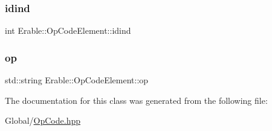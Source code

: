 \mbox{\label{class_erable_1_1_op_code_element_a7a7b309abb91e24736ecbf60f0cca4f0}} 
\subsubsection{\texorpdfstring{idind}{idind}}
{\footnotesize\ttfamily int Erable\+::\+Op\+Code\+Element\+::idind}

\mbox{\label{class_erable_1_1_op_code_element_aeabd3e06b3e767c681827b49e44f8df6}} 
\subsubsection{\texorpdfstring{op}{op}}
{\footnotesize\ttfamily std\+::string Erable\+::\+Op\+Code\+Element\+::op}



The documentation for this class was generated from the following file\+:\begin{DoxyCompactItemize}
\item 
Global/\mbox{\hyperlink{_op_code_8hpp}{Op\+Code.\+hpp}}\end{DoxyCompactItemize}
